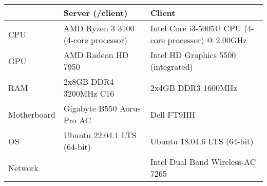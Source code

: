\begin{tabular}{lll}
\hline
					    & Server (/client)                                           & Client                                               \\ \hline
CPU				   & AMD Ryzen 3 3100 (4-core processor)    & Intel Core i3-5005U CPU (4-core processor) @ 2.00GHz \\ \hline
GPU                & AMD Radeon HD 7950                             & Intel HD Graphics 5500 (integrated)                  \\ \hline
RAM               & 2x8GB DDR4 3200MHz C16                    & 2x4GB DDR3 1600MHz                                   \\ \hline
Motherboard & Gigabyte B550 Aorus Pro AC                   & Dell FT9HH                                           \\ \hline
OS                   & Ubuntu 22.04.1 LTS (64-bit)                      & Ubuntu 18.04.6 LTS (64-bit)                          \\ \hline
Network         &                                                                       &  Intel Dual Band Wireless-AC 7265                                   \\ \hline
\end{tabular}